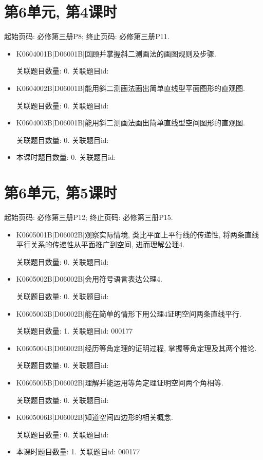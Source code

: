 \section*{第6单元, 第4课时}
起始页码: 必修第三册P8; 终止页码: 必修第三册P11.
\begin{itemize}
\item K0604001B|D06001B|回顾并掌握斜二测画法的画图规则及步骤.

关联题目数量: 0. 关联题目id: 

\item K0604002B|D06001B|能用斜二测画法画出简单直线型平面图形的直观图.

关联题目数量: 0. 关联题目id: 

\item K0604003B|D06001B|能用斜二测画法画出简单直线型空间图形的直观图.

关联题目数量: 0. 关联题目id: 

\item 本课时题目数量: 0. 关联题目id: 

\end{itemize}

\section*{第6单元, 第5课时}
起始页码: 必修第三册P12; 终止页码: 必修第三册P15.
\begin{itemize}
\item K0605001B|D06002B|观察实际情境, 类比平面上平行线的传递性, 将两条直线平行关系的传递性从平面推广到空间, 进而理解公理4.

关联题目数量: 0. 关联题目id: 

\item K0605002B|D06002B|会用符号语言表达公理4.

关联题目数量: 0. 关联题目id: 

\item K0605003B|D06002B|能在简单的情形下用公理4证明空间两条直线平行.

关联题目数量: 1. 关联题目id: 000177

\item K0605004B|D06002B|经历等角定理的证明过程, 掌握等角定理及其两个推论.

关联题目数量: 0. 关联题目id: 

\item K0605005B|D06002B|理解并能运用等角定理证明空间两个角相等.

关联题目数量: 0. 关联题目id: 

\item K0605006B|D06002B|知道空间四边形的相关概念.

关联题目数量: 0. 关联题目id: 

\item 本课时题目数量: 1. 关联题目id: 000177

\end{itemize}

